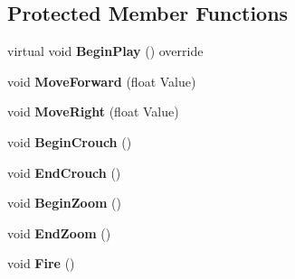 \subsection*{Protected Member Functions}
\begin{DoxyCompactItemize}
\item 
\mbox{\label{class_a_main_character_a096ef46022cd84777b571482729ed02f}} 
virtual void {\bfseries Begin\+Play} () override
\item 
\mbox{\label{class_a_main_character_aa85b946058cdc5f9b68ce529c9c680d8}} 
void {\bfseries Move\+Forward} (float Value)
\item 
\mbox{\label{class_a_main_character_aa3b2268816c54828d166ea626fdde411}} 
void {\bfseries Move\+Right} (float Value)
\item 
\mbox{\label{class_a_main_character_a44625f8c76490dfa989dc046b0612e07}} 
void {\bfseries Begin\+Crouch} ()
\item 
\mbox{\label{class_a_main_character_a633a5955e941f4ff343709eed9141154}} 
void {\bfseries End\+Crouch} ()
\item 
\mbox{\label{class_a_main_character_a4f7eea1e58e20b96564f3408f49737b6}} 
void {\bfseries Begin\+Zoom} ()
\item 
\mbox{\label{class_a_main_character_ab226b5c0e4c8fa348e61f0da84680d3e}} 
void {\bfseries End\+Zoom} ()
\item 
\mbox{\label{class_a_main_character_a741be0918633d2d40692e97dfba67d69}} 
void {\bfseries Fire} ()
\end{DoxyCompactItemize}

